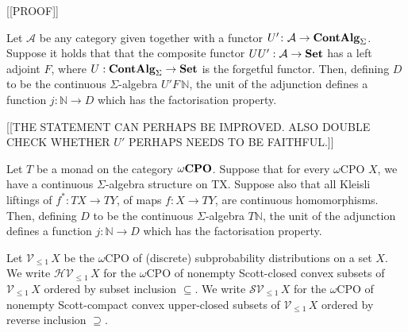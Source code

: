 [[PROOF]]

\begin{alemma}
Let $\mathcal{A}$ be any category given together with a functor $U' \colon \mathcal{A} \to \mathbf{ContAlg}_\Sigma$.
Suppose it holds that that the
composite functor $UU' : \mathcal{A} \to \mathbf{Set}$ has a left adjoint $F$, where $U: \mathbf{ContAlg}_\Sigma \to \mathbf{Set}$ is the forgetful functor.
Then, defining $D$ to be the continuous $\Sigma$-algebra $U' F \, \mathbb{N}$, the unit of the adjunction defines a function
$j \colon \mathbb{N} \to D$ which has the factorisation property.
\end{alemma}

[[THE STATEMENT CAN PERHAPS BE IMPROVED. ALSO DOUBLE CHECK WHETHER $U'$ PERHAPS NEEDS TO BE FAITHFUL.]]


\begin{alemma}
Let $T$ be a monad on the category $\mathbf{{\omega}CPO}$.  Suppose that for every $\omega$CPO $X$, we have a 
continuous $\Sigma$-algebra structure on TX. Suppose also that all Kleisli liftings of 
$f^* \colon TX \to TY$, of maps $f \colon X \to TY$, are  continuous  homomorphisms. Then,
defining $D$ to be the continuous $\Sigma$-algebra $T \mathbb{N}$, the unit of the adjunction defines a function
$j \colon \mathbb{N} \to D$ which has the factorisation property.
\end{alemma}

Let $\mathcal{V}_{\leq 1} \,X$ be the $\omega$CPO of (discrete) subprobability distributions on a set $X$.
We write $\mathcal{H}\mathcal{V}_{\leq 1} \,X$ for the $\omega$CPO of nonempty Scott-closed convex subsets
of  $\mathcal{V}_{\leq 1} \,X$  ordered by subset inclusion $\subseteq$. 
We write $\mathcal{S}\mathcal{V}_{\leq 1} \,X$ for the $\omega$CPO of nonempty Scott-compact convex upper-closed subsets
of  $\mathcal{V}_{\leq 1} \,X$  ordered by reverse inclusion $\supseteq$.

